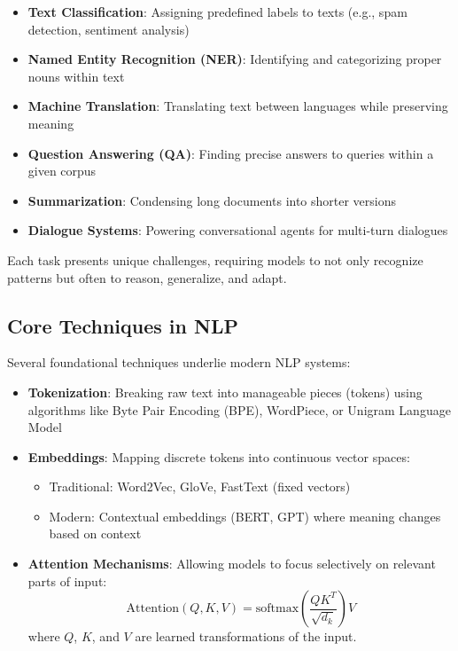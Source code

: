 \documentclass[openany]{book}
\begin{document}
\begin{itemize}
    \item \textbf{Text Classification}: Assigning predefined labels to texts 
    (e.g., spam detection, sentiment analysis)
    \item \textbf{Named Entity Recognition (NER)}: Identifying and categorizing 
    proper nouns within text
    \item \textbf{Machine Translation}: Translating text between languages while 
    preserving meaning
    \item \textbf{Question Answering (QA)}: Finding precise answers to queries
     within a given corpus
    \item \textbf{Summarization}: Condensing long documents into shorter 
    versions
    \item \textbf{Dialogue Systems}: Powering conversational agents for 
    multi-turn dialogues
\end{itemize}

Each task presents unique challenges, requiring models to not only recognize 
patterns but often to reason, generalize, and adapt.

\subsection{Core Techniques in NLP}
Several foundational techniques underlie modern NLP systems:

\begin{itemize}
    \item \textbf{Tokenization}: Breaking raw text into manageable pieces 
    (tokens) using algorithms like Byte Pair Encoding (BPE), WordPiece, or 
    Unigram Language Model
    
    \item \textbf{Embeddings}: Mapping discrete tokens into continuous vector 
    spaces:
    \begin{itemize}
        \item Traditional: Word2Vec, GloVe, FastText (fixed vectors)
        \item Modern: Contextual embeddings (BERT, GPT) where meaning changes 
        based on context
    \end{itemize}
    
    \item \textbf{Attention Mechanisms}: Allowing models to focus selectively 
    on relevant parts of input:
    \begin{equation}
        \text{Attention}(Q, K, V) = 
        \text{softmax}\left(\frac{QK^T}{\sqrt{d_k}}\right)V
    \end{equation}
    where $Q$, $K$, and $V$ are learned transformations of the input.
\end{itemize}
\end{document}

